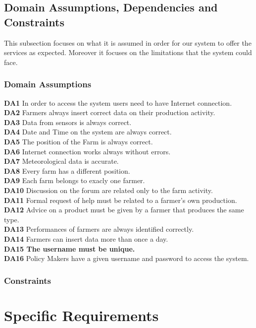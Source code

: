 \documentclass{article}
\begin{document}
\subsection{Domain Assumptions, Dependencies and Constraints}
This subsection focuses on what it is assumed in order for our system to offer the services as expected.
Moreover it focuses on the limitations that the system could face.

\subsubsection{Domain Assumptions}
\textbf{DA1} In order to access the system users need to have Internet connection.\\
\textbf{DA2} Farmers always insert correct data on their production activity.\\
\textbf{DA3} Data from sensors is always correct.\\
\textbf{DA4} Date and Time on the system are always correct.\\
\textbf{DA5} The position of the Farm is always correct.\\
\textbf{DA6} Internet connection works always without errors.\\
\textbf{DA7} Meteorological data is accurate.\\
\textbf{DA8} Every farm has a different position.\\
\textbf{DA9} Each farm belongs to exacly one farmer.\\
\textbf{DA10} Discussion on the forum are related only to the farm activity.\\
\textbf{DA11} Formal request of help must be related to a farmer's own production.\\
\textbf{DA12} Advice on a product must be given by a farmer that produces the same type.\\
\textbf{DA13} Performances of farmers are always identified correctly.\\
\textbf{DA14} Farmers can insert data more than once a day.\\
\textbf{DA15 The username must be unique.}\\
\textbf{DA16} Policy Makers have a given username and password to access the system.

\subsubsection{Constraints}


\section{Specific Requirements}
\end{document}
